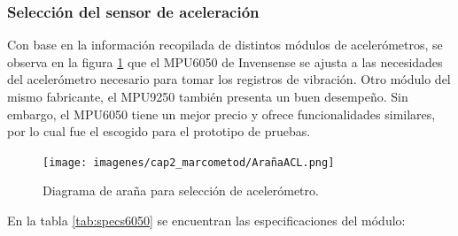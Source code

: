 \subsubsection{Selección del sensor de aceleración}

Con base en la información recopilada de distintos módulos de acelerómetros, se observa en la figura \ref{fig:arañaacl} que el MPU6050 de Invensense se ajusta a las necesidades del acelerómetro necesario para tomar los registros de vibración. Otro módulo del mismo fabricante, el MPU9250 también presenta un buen desempeño. Sin embargo, el MPU6050 tiene un mejor precio y ofrece funcionalidades similares, por lo cual fue el escogido para el prototipo de pruebas.


\begin{figure}[H]
    \centering
    \texttt{[image: imagenes/cap2\_marcometod/ArañaACL.png]}
    \caption{Diagrama de araña para selección de acelerómetro.}
    \label{fig:arañaacl}
\end{figure}

En la tabla \ref{tab:specs6050} se encuentran las especificaciones del módulo:

\begin{table}[H]
    \centering
    \caption{Especificaciones del MPU6050 de Invensense.}
    \label{tab:specs6050}
    \end{table}

